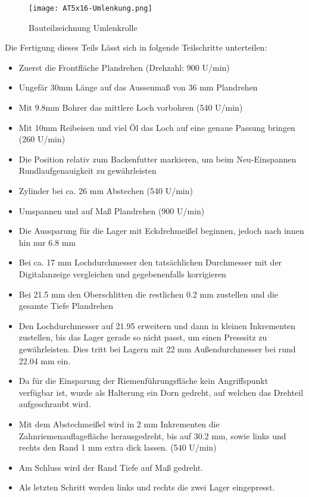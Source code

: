 \begin{figure}[H]
    \centering
    \texttt{[image: AT5x16-Umlenkung.png]}
    \caption{Bauteilzeichnung Umlenkrolle}
    \label{UmlenkrolleBTZ}
\end{figure}

Die Fertigung dieses Teils Lässt sich in folgende Teilschritte unterteilen:
\begin{itemize}
    \setlength\itemsep{-1mm} %
    \item Zuerst die Frontfläche Plandrehen (Drehzahl: 900 U/min)
    \item Ungefär 30mm Länge auf das Aussenmaß von 36 mm Plandrehen
    \item Mit 9.8mm Bohrer das mittlere Loch vorbohren (540 U/min)
    \item Mit 10mm Reibeisen und viel Öl das Loch auf eine genaue Passung bringen (260 U/min)
    \item Die Position relativ zum Backenfutter markieren, um beim Neu-Einspannen Rundlaufgenauigkeit zu gewährleisten
    \item Zylinder bei ca. 26 mm Abstechen (540 U/min)
    \item Umspannen und auf Maß Plandrehen (900 U/min)
    \item Die Aussparung für die Lager mit Eckdrehmeißel beginnen, jedoch nach innen hin nur 6.8 mm
    \item Bei ca. 17 mm Lochdurchmesser den tatsächlichen Durchmesser mit der Digitalanzeige vergleichen und gegebenenfalls korrigieren
    \item Bei 21.5 mm den Oberschlitten die restlichen 0.2 mm zustellen und die gesamte Tiefe Plandrehen
    \item Den Lochdurchmesser auf 21.95 erweitern und dann in kleinen Inkrementen zustellen, bis das Lager gerade so nicht passt, um einen Presssitz zu gewährleisten. Dies tritt bei Lagern mit 22 mm Außendurchmesser bei rund 22.04 mm ein.
    \item Da für die Einsparung der Riemenführungsfläche kein Angriffspunkt verfügbar ist, wurde als Halterung ein Dorn gedreht, auf welchen das Drehteil aufgeschraubt wird.
    \item Mit dem Abstechmeißel wird in 2 mm Inkrementen die Zahnriemenauflagefläche herausgedreht, bis auf 30.2 mm, sowie links und rechts den Rand 1 mm extra dick lassen. (540 U/min)
    \item Am Schluss wird der Rand Tiefe auf Maß gedreht.
    \item Als letzten Schritt werden links und rechts die zwei Lager eingepresst.
\end{itemize}

